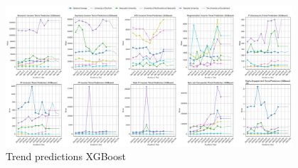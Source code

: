 \documentclass[journal,onecolumn, 10pt,draftclsnofoot]{IEEEtran}
\begin{document}
\begin{figure}[h]
\centering
\includegraphics[width=0.95\textwidth]{Fig/appendix4.trend_predictions_xgboost.png}
\caption{Trend predictions XGBoost}
\label{fig:trend-predictions-xgboost}
\end{figure}

\clearpage


\end{document}
